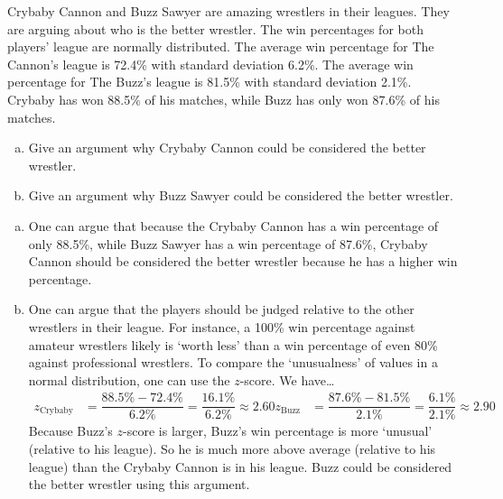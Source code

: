 \documentclass[11pt,letterpaper]{article}
\begin{document}

 Crybaby Cannon and Buzz Sawyer are amazing wrestlers in their leagues. They are arguing about who is the better wrestler. The win percentages for both players' league are normally distributed. The average win percentage for The Cannon's league is 72.4\% with standard deviation 6.2\%. The average win percentage for The Buzz's league is 81.5\% with standard deviation 2.1\%. Crybaby has won 88.5\% of his matches, while Buzz has only won 87.6\% of his matches. 
	\begin{enumerate}[(a)]
	\item Give an argument why Crybaby Cannon could be considered the better wrestler. 
	\item Give an argument why Buzz Sawyer could be considered the better wrestler.
	\end{enumerate} \pspace

\sol 
\begin{enumerate}[(a)]
\item One can argue that because the Crybaby Cannon has a win percentage of only 88.5\%, while Buzz Sawyer has a win percentage of 87.6\%, Crybaby Cannon should be considered the better wrestler because he has a higher win percentage. \pspace

\item One can argue that the players should be judged relative to the other wrestlers in their league. For instance, a 100\% win percentage against amateur wrestlers likely is `worth less' than a win percentage of even 80\% against professional wrestlers. To compare the `unusualness' of values in a normal distribution, one can use the $z$-score. We have\dots
	\[
	\begin{aligned}
	z_{\text{Crybaby}}&= \dfrac{88.5\% - 72.4\%}{6.2\%}= \dfrac{16.1\%}{6.2\%} \approx 2.60
	z_{\text{Buzz}}&= \dfrac{87.6\% - 81.5\%}{2.1\%}= \dfrac{6.1\%}{2.1\%} \approx 2.90
	\end{aligned}
	\]
Because Buzz's $z$-score is larger, Buzz's win percentage is more `unusual' (relative to his league). So he is much more above average (relative to his league) than the Crybaby Cannon is in his league. Buzz could be considered the better wrestler using this argument. 
\end{enumerate}



\newpage
\end{document}

